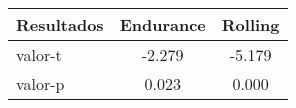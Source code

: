 \documentclass[varwidth=\maxdimen]{standalone}
\begin{document}
\begin{tabular}{ l c c }
	\toprule
	Resultados	& Endurance	& Rolling \\
	\midrule
	valor-t		& -2.279	& -5.179 \\
	valor-p		& 0.023		& 0.000 \\
	\bottomrule
\end{tabular}
\end{document}
